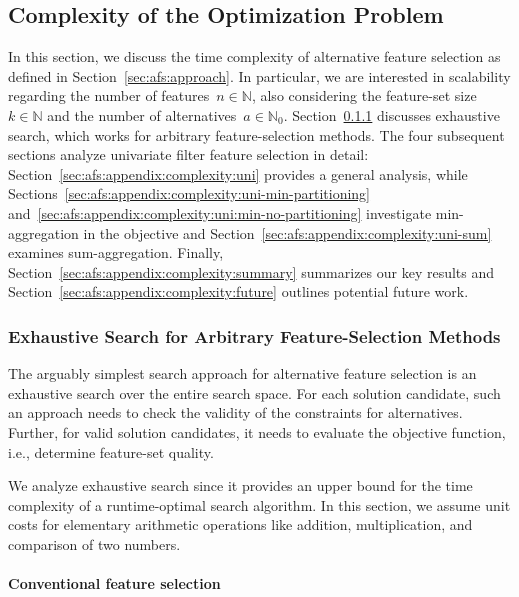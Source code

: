 \documentclass{article}
\theoremstyle{definition}
\begin{document}
\subsection{Complexity of the Optimization Problem}
\label{sec:afs:appendix:complexity}

In this section, we discuss the time complexity of alternative feature selection as defined in Section~\ref{sec:afs:approach}.
In particular, we are interested in scalability regarding the number of features~$n \in \mathbb{N}$, also considering the feature-set size~$k \in \mathbb{N}$ and the number of alternatives~$a \in \mathbb{N}_0$.
Section~\ref{sec:afs:appendix:complexity:exhaustive} discusses exhaustive search, which works for arbitrary feature-selection methods.
The four subsequent sections analyze univariate filter feature selection in detail:
Section~\ref{sec:afs:appendix:complexity:uni} provides a general analysis, while Sections~\ref{sec:afs:appendix:complexity:uni-min-partitioning} and~\ref{sec:afs:appendix:complexity:uni:min-no-partitioning} investigate min-aggregation in the objective and Section~\ref{sec:afs:appendix:complexity:uni-sum} examines sum-aggregation.
Finally, Section~\ref{sec:afs:appendix:complexity:summary} summarizes our key results and Section~\ref{sec:afs:appendix:complexity:future} outlines potential future work.

\subsubsection{Exhaustive Search for Arbitrary Feature-Selection Methods}
\label{sec:afs:appendix:complexity:exhaustive}

The arguably simplest search approach for alternative feature selection is an exhaustive search over the entire search space.
For each solution candidate, such an approach needs to check the validity of the constraints for alternatives.
Further, for valid solution candidates, it needs to evaluate the objective function, i.e., determine feature-set quality.

We analyze exhaustive search since it provides an upper bound for the time complexity of a runtime-optimal search algorithm.
In this section, we assume unit costs for elementary arithmetic operations like addition, multiplication, and comparison of two numbers.

\paragraph{Conventional feature selection}
\end{document}
